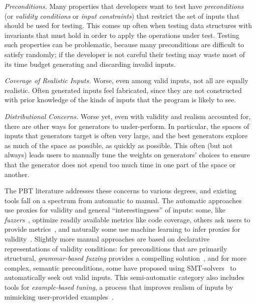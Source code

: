 
{\em Preconditions.}
Many properties that developers want to test have {\em preconditions}
(or {\em validity conditions} or {\em input constraints}) that
restrict the set of inputs that should be used for testing. This comes up often
when testing data structures with invariants that must hold in order to apply
the operations under test. Testing such properties can be problematic, because
many preconditions are difficult to satisfy randomly; if the developer is not
careful their testing may waste most of its time budget generating and
discarding invalid inputs.

{\em Coverage of Realistic Inputs.}
Worse, even among valid inputs, not all are equally realistic. Often generated inputs
feel fabricated, since they are not constructed with prior knowledge of the
kinds of inputs that the program is likely to see.

{\em Distributional Concerns.}
Worse yet, even with validity and realism accounted for, there are other ways for
generators to under-perform. In particular, the spaces of inputs that generators
target is often very large, and the best generators explore as much of the space
as possible, as quickly as possible. This often (but not always) leads users to manually tune
the weights on generators' choices to ensure that the generator does not spend
too much time in one part of the space or another.


The PBT literature addresses these concerns to various degrees, and existing tools
fall on a spectrum from automatic to manual. The automatic approaches use
proxies for validity and general ``interestingness'' of inputs: some, like {\em
fuzzers}~\cite{afl-readme}, optimize readily available metrics like code
coverage, others ask users to provide metrics~\cite{loscher2017targetedpbt}, and
naturally some use machine learning to infer proxies for
validity~\cite{godefroid2017learn, DBLP:conf/icse/ReddyLPS20}. Slightly more
manual approaches are based on declarative representations of validity
conditions: for preconditions that are primarily structural, {\em grammar-based
fuzzing} provides a compelling solution~\cite{godefroid2008grammar,
holler2012fuzzing, veggalam2016ifuzzer, wang2019superion,
srivastava2021gramatron}, and for more complex, semantic preconditions, some
have proposed using SMT-solvers~\cite{dewey2017automated, LuckPOPL,
steinhofel2022input} to automatically seek out valid inputs. This semi-automatic
category also includes tools for {\em example-based tuning}, a process that
improves realism of inputs by mimicking user-provided
examples~\cite{soremekun2020inputs}.  

